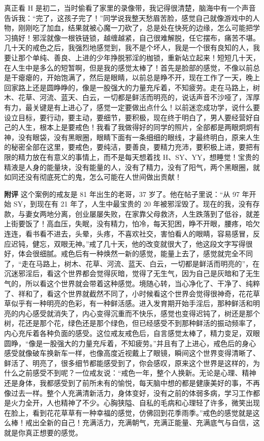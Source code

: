 \begin{case}
    真正看 H 是初二，当时偷看了家里的录像带，我记得很清楚，脑海中有一个声音告诉我：“完了，这孩子完了！”同学说我整天愁眉苦脸，感觉自己就像游戏中的人物，刚刚吃了加血，结果就被心魔一刀砍了，总是处在快死的边缘，怎么可能把学习搞好！邪淫就像一根铁链锁，越缠越紧，自己很难解脱，任它摆布，痛苦不堪。几十天的戒色之后，我强烈地感觉到，我不是个坏人，我是一个很有良知的人，我要让那个单纯、善良、上进的少年挣脱邪淫的枷锁，重新站立起来！短短几十天，在人生中是多么的短暂啊，但是我的感觉太棒了！首先是脸部的感觉，不像以前总是干瘪瘪的，开始饱满了，然后是眼睛，以前总是睁不开，现在工作了一天，晚上回家路上还是圆睁睁的，像是一股强大的力量充斥着，不知疲劳。走在马路上，树木、花草、河流、蓝天、白云，一切都是鲜活而明亮的，说话声音不沙哑了，浑厚有力，最关键是有上进心了，感觉一定要做出点什么！以前迷恋成功学，说什么要设立目标，要行动，要主动，要细节，要积极，现在终于明白了，男人要经营好自己的人生，根本上是要戒色！我看了我做得好的同学的照片，全部都是两眼炯炯有神，没有眼袋，没有黑眼圈，眼睛下面有一条细细的眼线，才最终明白，原来人生的秘密全部在这里，要戒色，要纯洁，要善良，要精力充沛，要积极上进，要把有限的精力放在有意义的事情上，而不是每天想着找 H、SY、YY，想睡觉！宝贵的精液是人身的能量块，没有能量的人，没有了精力，没有了阳气，两个黑眼圈，就如同还没有彻底死亡的鬼，怎么可能在人世间做出贡献！

    \textbf{附评} 这个案例的戒友是 81 年出生的老哥，37 岁了。他在帖子里说：“从 97 年开始 SY，到现在有 21 年了，人生中最宝贵的 20 年被邪淫毁了。现在的我，没有存款，与妻女两地分离，创业屡屡失败，在家靠父母救济，人生跌落到了低谷，就差上街要饭了！高血压，失眠，没有精力，怕冷，每天犯困，睁不开眼，腰疼，哈欠连连，看书看不进去，头晕，头疼，不喜欢社交，害怕看人的眼睛，容易感冒，反应迟钝，健忘，双眼无神。”戒了几十天，他的改变就很大了，他这段文字写得很好，体会很细腻。戒色后有一种焕然一新的感觉，能量上去了，感觉就完全不同了，“走在马路上，树木、花草、河流、蓝天、白云，一切都是鲜活而明亮的”，在沉迷邪淫后，看这个世界都会觉得灰暗，觉得了无生气，因为自己是灰暗和了无生气的，所以看这个世界就会带着这种感觉。境随心转，当心净化了、干净了、纯粹了、祥和了，看这个世界就截然不同了，小时候看这个世界会觉得很神奇，花花草草似乎有一种明亮的色彩，有一种鲜活感。进入发育期开始手淫后，那种鲜活和明亮的内心感受就消失了，内心变得沉重而不快乐，感觉也变得迟钝了，树还是那个树，花还是那个花，绿色还是那个绿色，但已经感受不到那种鲜活的振动频率了，内心充斥着各种负面的感受。这位戒友戒色后，自言感觉太棒了，精力变足，双眼圆睁，“像是一股强大的力量充斥着，不知疲劳。”并且有了上进心，戒色后的身心感受就像破车换新车一样，也像高度近视戴上了眼镜，瞬间这个世界变得清晰了、鲜活了、明亮了，很多细节都能感受到了，你会感叹，原来这个世界是这样的，为什么之前感受不到呢？一位戒友说：“戒色一年，整个人换新。无论是心理、精神还是身体，我都感受到了前所未有的愉悦，每天脑中想的都是健康美好的事，不再像过去一样。整个人充满清新活力，身体变好，没有之前的体弱多病，学习工作都是火力全开，人也精神了不少。心胸狭隘、自私的毛病和心理轻了许多，微笑出现在脸上，看到花花草草有一种幸福的感觉，仿佛回到花季雨季。”戒色的感觉就是这么棒！戒出全新的自己！充满活力，充满朝气，充满正能量、充满底气与自信，这就是你真正想要的感觉。


\end{case}
